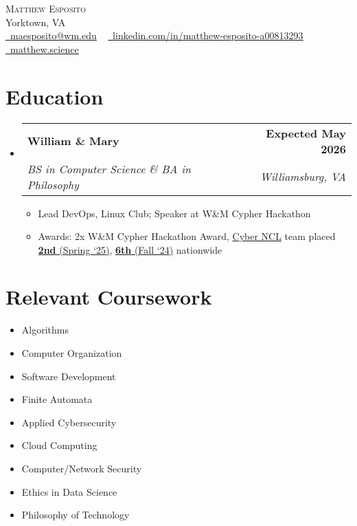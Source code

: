 \documentclass[letterpaper, 11pt]{article}
\makeatletter
\newcommand{\resumeItem}[1]{ \item\small{ {#1 \vspace{-2pt}} } }
\newcommand{\resumeSubheading}[4]{
\vspace{-2pt}
\item
\begin{tabular*}{1.0\textwidth}[t]{l@{\extracolsep{\fill}}r}
	\textbf{#1}       & \textbf{\small #2} \\
	\textit{\small#3} & \textit{\small #4} \\
\end{tabular*}
\vspace{-8pt}
}
\newcommand{\resumeSubHeadingListStart}{\begin{itemize}[leftmargin=0.0in, label={}]}
\newcommand{\resumeSubHeadingListEnd}{\end{itemize}}
\newcommand{\resumeItemListStart}{\vspace{-6pt}\begin{itemize}}
\newcommand{\resumeItemListEnd}{\end{itemize}
\vspace{-6pt}}
\makeatother
\begin{document}
	\begin{center}
		{\Huge \scshape Matthew Esposito} \\
		\vspace{1pt}
		Yorktown, VA \\
		\vspace{1pt}
		\href{mailto:maesposito@wm.edu}{\raisebox{-0.2\height}{\faEnvelope}\ \underline{maesposito@wm.edu}}
		~
		\href{https://linkedin.com/in/matthew-esposito-a00813293/}{\raisebox{-0.2\height}{\faLinkedin}\ \underline{linkedin.com/in/matthew-esposito-a00813293}}
        ~
        \href{https://matthew.science/}{\raisebox{-0.2\height}{\faGlobe}\ \underline{matthew.science}}
		\vspace{-8pt}
	\end{center}

	\section{Education}
	\resumeSubHeadingListStart \resumeSubheading {William \& Mary}{Expected May 2026}
	{BS in Computer Science \& BA in Philosophy}{Williamsburg, VA}
	\resumeItemListStart \resumeItem{Lead DevOps, Linux Club; Speaker at W\&M Cypher Hackathon}
	\resumeItem{Awards: 2x W\&M Cypher Hackathon Award, \href{https://nationalcyberleague.org/competition}{Cyber NCL} team placed \href{https://www.wm.edu/as/computerscience/about-contactus/news/tribecyber-has-spoken.php}{\textbf{2nd} (Spring `25)}, \href{https://www.wm.edu/as/computerscience/about-contactus/news/william-mary-cyber-teams-close-out-2024-ranked-6th-in-the-nation.php}{\textbf{6th} (Fall `24)} nationwide}
	\resumeItemListEnd \resumeSubHeadingListEnd

	\section{Relevant Coursework}
	\begin{multicols}{4}
		{\small \begin{itemize}[itemsep=-5pt, parsep=3pt]\item Algorithms

		\item Computer Organization

		\item Software Development

		\item Finite Automata

		\item Applied Cybersecurity

		\item Cloud Computing

		\item Computer/Network Security

		\item Ethics in Data Science

		\item Philosophy of Technology\end{itemize} }
	\end{multicols}
	\vspace*{2.0\multicolsep}
\end{document}
